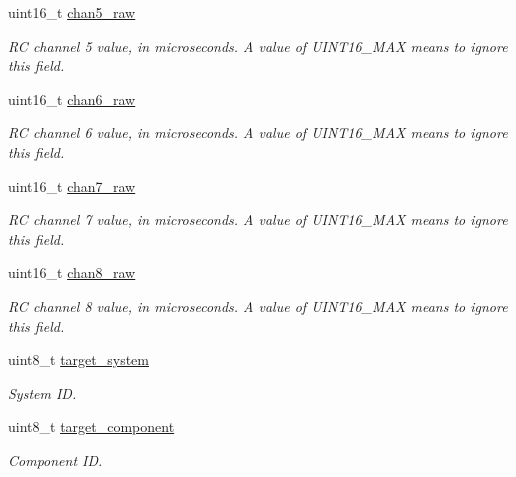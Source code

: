 \begin{DoxyCompactItemize}
uint16\+\_\+t \hyperlink{struct____mavlink__rc__channels__override__t_a97c62336395d208d02837ca92085f3ac}{chan5\+\_\+raw}
\begin{DoxyCompactList}\small\item\em R\+C channel 5 value, in microseconds. A value of U\+I\+N\+T16\+\_\+\+M\+A\+X means to ignore this field. \end{DoxyCompactList}\item 
uint16\+\_\+t \hyperlink{struct____mavlink__rc__channels__override__t_a8bef6b7819abe782e905da536c34b11d}{chan6\+\_\+raw}
\begin{DoxyCompactList}\small\item\em R\+C channel 6 value, in microseconds. A value of U\+I\+N\+T16\+\_\+\+M\+A\+X means to ignore this field. \end{DoxyCompactList}\item 
uint16\+\_\+t \hyperlink{struct____mavlink__rc__channels__override__t_a0380add4a72cd924a6ac61d1504dad82}{chan7\+\_\+raw}
\begin{DoxyCompactList}\small\item\em R\+C channel 7 value, in microseconds. A value of U\+I\+N\+T16\+\_\+\+M\+A\+X means to ignore this field. \end{DoxyCompactList}\item 
uint16\+\_\+t \hyperlink{struct____mavlink__rc__channels__override__t_a8028c42950c16d10f196f35df6d32404}{chan8\+\_\+raw}
\begin{DoxyCompactList}\small\item\em R\+C channel 8 value, in microseconds. A value of U\+I\+N\+T16\+\_\+\+M\+A\+X means to ignore this field. \end{DoxyCompactList}\item 
uint8\+\_\+t \hyperlink{struct____mavlink__rc__channels__override__t_a0c5393c94e6462a75244ad5083f310f8}{target\+\_\+system}
\begin{DoxyCompactList}\small\item\em System I\+D. \end{DoxyCompactList}\item 
uint8\+\_\+t \hyperlink{struct____mavlink__rc__channels__override__t_af53aa3ccd48e674dd69ad102616b4045}{target\+\_\+component}
\begin{DoxyCompactList}\small\item\em Component I\+D. \end{DoxyCompactList}\end{DoxyCompactItemize}


